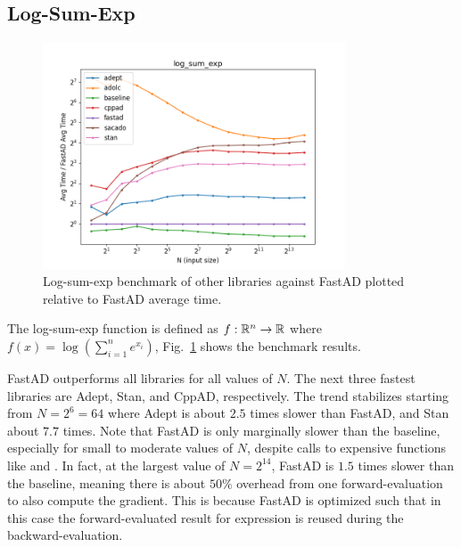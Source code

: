 \subsection{Log-Sum-Exp}

\begin{figure}[t]
    \centering
    \includegraphics[width=0.8\textwidth]{figs/log_sum_exp_fig.png}
    \caption{%
        Log-sum-exp benchmark of other libraries against FastAD 
        plotted relative to FastAD average time.
    }\label{fig:log_sum_exp}
\end{figure}

The log-sum-exp function is defined as $f:\mathbb{R}^n \to \mathbb{R}$ 
where~$f(x) = \log(\sum\limits_{i=1}^n e^{x_i})$,
Fig.~\ref{fig:log_sum_exp} shows the benchmark results.

FastAD outperforms all libraries for all values of $N$.
The next three fastest libraries are Adept, Stan, and CppAD, respectively.
The trend stabilizes starting from $N=2^6=64$ where 
Adept is about $ 2.5$ times slower than FastAD, 
and Stan about $ 7.7$ times.
Note that FastAD is only marginally slower than the baseline,
especially for small to moderate values of $N$,
despite calls to expensive functions like  and .
In fact, at the largest value of $N = 2^{14}$, 
FastAD is $ 1.5$ times slower than the baseline, 
meaning there is about $ 50\%$
overhead from one forward-evaluation to also compute the gradient.
This is because FastAD is optimized such that in this case
the forward-evaluated result for  expression is reused
during the backward-evaluation.

